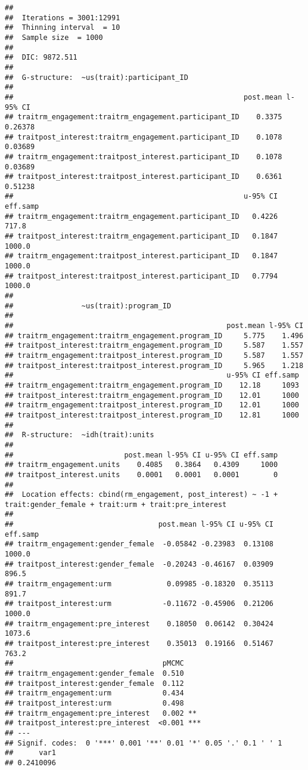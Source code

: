 \documentclass[man]{apa6}
\theoremstyle{definition}
\theoremstyle{definition}
\theoremstyle{definition}
\theoremstyle{remark}
\begin{document}
\begin{verbatim}
## 
##  Iterations = 3001:12991
##  Thinning interval  = 10
##  Sample size  = 1000 
## 
##  DIC: 9872.511 
## 
##  G-structure:  ~us(trait):participant_ID
## 
##                                                      post.mean l-95% CI
## traitrm_engagement:traitrm_engagement.participant_ID    0.3375  0.26378
## traitpost_interest:traitrm_engagement.participant_ID    0.1078  0.03689
## traitrm_engagement:traitpost_interest.participant_ID    0.1078  0.03689
## traitpost_interest:traitpost_interest.participant_ID    0.6361  0.51238
##                                                      u-95% CI eff.samp
## traitrm_engagement:traitrm_engagement.participant_ID   0.4226    717.8
## traitpost_interest:traitrm_engagement.participant_ID   0.1847   1000.0
## traitrm_engagement:traitpost_interest.participant_ID   0.1847   1000.0
## traitpost_interest:traitpost_interest.participant_ID   0.7794   1000.0
## 
##                ~us(trait):program_ID
## 
##                                                  post.mean l-95% CI
## traitrm_engagement:traitrm_engagement.program_ID     5.775    1.496
## traitpost_interest:traitrm_engagement.program_ID     5.587    1.557
## traitrm_engagement:traitpost_interest.program_ID     5.587    1.557
## traitpost_interest:traitpost_interest.program_ID     5.965    1.218
##                                                  u-95% CI eff.samp
## traitrm_engagement:traitrm_engagement.program_ID    12.18     1093
## traitpost_interest:traitrm_engagement.program_ID    12.01     1000
## traitrm_engagement:traitpost_interest.program_ID    12.01     1000
## traitpost_interest:traitpost_interest.program_ID    12.81     1000
## 
##  R-structure:  ~idh(trait):units
## 
##                          post.mean l-95% CI u-95% CI eff.samp
## traitrm_engagement.units    0.4085   0.3864   0.4309     1000
## traitpost_interest.units    0.0001   0.0001   0.0001        0
## 
##  Location effects: cbind(rm_engagement, post_interest) ~ -1 + trait:gender_female + trait:urm + trait:pre_interest 
## 
##                                  post.mean l-95% CI u-95% CI eff.samp
## traitrm_engagement:gender_female  -0.05842 -0.23983  0.13108   1000.0
## traitpost_interest:gender_female  -0.20243 -0.46167  0.03909    896.5
## traitrm_engagement:urm             0.09985 -0.18320  0.35113    891.7
## traitpost_interest:urm            -0.11672 -0.45906  0.21206   1000.0
## traitrm_engagement:pre_interest    0.18050  0.06142  0.30424   1073.6
## traitpost_interest:pre_interest    0.35013  0.19166  0.51467    763.2
##                                   pMCMC    
## traitrm_engagement:gender_female  0.510    
## traitpost_interest:gender_female  0.112    
## traitrm_engagement:urm            0.434    
## traitpost_interest:urm            0.498    
## traitrm_engagement:pre_interest   0.002 ** 
## traitpost_interest:pre_interest  <0.001 ***
## ---
## Signif. codes:  0 '***' 0.001 '**' 0.01 '*' 0.05 '.' 0.1 ' ' 1
##      var1 
## 0.2410096
\end{verbatim}
\end{document}
